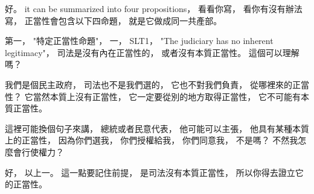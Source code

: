\hypertarget{w02:cue:1246}{}好。
\hypertarget{w02:cue:1247}{}it can be summarized into four propositions，
\hypertarget{w02:cue:1248}{}看看你寫，
\hypertarget{w02:cue:1249}{}看你有沒有辦法寫，
\hypertarget{w02:cue:1250}{}正當性會包含以下四命題，
\hypertarget{w02:cue:1251}{}就是它做成同一共產部。

\hypertarget{w02:cue:1252}{}第一，
\hypertarget{w02:cue:1253}{}"特定正當性命題"，
\hypertarget{w02:cue:1254}{}一，
\hypertarget{w02:cue:1255}{}SLT1，
\hypertarget{w02:cue:1256}{}"The judiciary has no inherent legitimacy"，
\hypertarget{w02:cue:1257}{}司法是沒有內在正當性的，
\hypertarget{w02:cue:1258}{}或者沒有本質正當性。
\hypertarget{w02:cue:1259}{}這個可以理解嗎？

\hypertarget{w02:cue:1260}{}我們是個民主政府，
\hypertarget{w02:cue:1261}{}司法也不是我們選的，
\hypertarget{w02:cue:1262}{}它也不對我們負責，
\hypertarget{w02:cue:1263}{}從哪裡來的正當性？
\hypertarget{w02:cue:1264}{}它當然本質上沒有正當性，
\hypertarget{w02:cue:1265}{}它一定要從別的地方取得正當性，
\hypertarget{w02:cue:1266}{}它不可能有本質正當性。

\hypertarget{w02:cue:1267}{}這裡可能換個句子來講，
\hypertarget{w02:cue:1268}{}總統或者民意代表，
\hypertarget{w02:cue:1269}{}他可能可以主張，
\hypertarget{w02:cue:1270}{}他具有某種本質上的正當性，
\hypertarget{w02:cue:1271}{}因為你們選我，
\hypertarget{w02:cue:1272}{}你們授權給我，
\hypertarget{w02:cue:1273}{}你們同意我，
\hypertarget{w02:cue:1274}{}不是嗎？
\hypertarget{w02:cue:1275}{}不然我怎麼會行使權力？

\hypertarget{w02:cue:1276}{}好，
\hypertarget{w02:cue:1277}{}以上一。
\hypertarget{w02:cue:1278}{}這一點要記住前提，
\hypertarget{w02:cue:1279}{}是司法沒有本質正當性，
\hypertarget{w02:cue:1280}{}所以你得去證立它的正當性。

